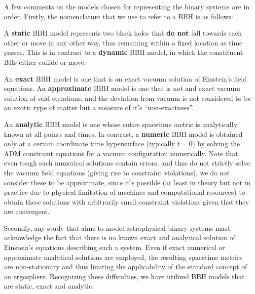 A few comments on the models chosen for representing the binary systems are in order. Firstly, the nomenclature that we use to refer to a BBH is as follows:

\begin{definition}
    A \textbf{static} BBH model represents two black holes that \textbf{do not} fall towards each other or move in any other way, thus remaining within a fixed location as time passes. This is in contrast to a \textbf{dynamic} BBH model, in which the constituent BHs either collide or move.
\end{definition}

\begin{definition}
    An \textbf{exact} BBH model is one that is an exact vacuum solution of Einstein's field equations. An \textbf{approximate} BBH model is one that is not  and exact vacuum solution of said equations, and the deviation from vacuum is not considered to be an exotic type of matter but a measure of it's ``non-exactness''.
\end{definition}

\begin{definition}
    An \textbf{analytic} BBH model is one whose entire spacetime metric is analytically known at all points and times. In contrast, a \textbf{numeric} BBH model is obtained only at a certain coordinate time hypersurface (typically $t=0$) by solving the ADM constraint equations for a vacuum configuration numerically. Note that even tough such numerical solutions contain errors, and thus do not strictly solve the vacuum field equations (giving rise to constraint violations), we do not consider these to be approximate, since it's possible (at least in theory but not in practice due to physical limitation of machines and computational resources) to obtain these solutions with arbitrarily small constraint violations given that they are convergent.
\end{definition}

Secondly, any study that aims to model astrophysical binary systems must acknowledge the fact that there is no known exact and analytical solution of Einstein's equations describing such a system. Even if exact numerical or approximate analytical solutions are employed, the resulting spacetime metrics are non-stationary and thus limiting the applicability of the standard concept of an ergosphere. Recognizing these difficulties, we have utilized BBH models that are static, exact and analytic.

